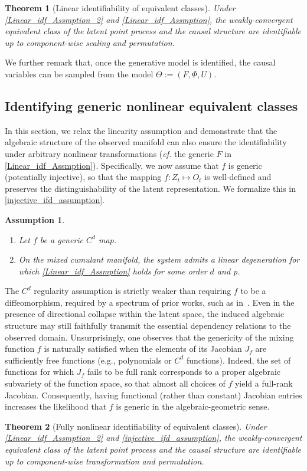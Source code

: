 \documentclass[10pt]{article}
\numberwithin{figure}{section}
\newtheorem{assumption}{Assumption}
\newtheorem{theorem}{Theorem}
\begin{document}
\begin{theorem}[Linear identifiability of equivalent classes]\label{linear_idf}
Under \autoref{Linear_idf_Assmption_2} and \ref{Linear_idf_Assmption},  the weakly-convergent equivalent class of the latent point process and the causal structure are identifiable up to component-wise scaling and permutation.
\end{theorem}

We further remark that,  once the generative model is identified, the causal variables can be sampled from the model $\Theta:=(F,\Phi, U)$.


\subsection{Identifying generic nonlinear equivalent classes }

In this section, we relax the linearity assumption and demonstrate that the algebraic structure of the observed manifold can also ensure the identifiability under arbitrary nonlinear transformations (\textit{cf.} the generic $F$ in \autoref{Linear_idf_Assmption}). Specifically, we now assume that $f$ is generic (potentially injective), so that the mapping $f: Z_t \mapsto O_t$ is well-defined and preserves the distinguishability of the latent representation. We formalize this in \autoref{injective_ifd_assumption}. 
\begin{assumption}\label{injective_ifd_assumption}
    \leavevmode
\begin{enumerate}
    \item Let $f$ be a generic $C^d$ map.
    \item On the mixed cumulant manifold, the system admits a linear degeneration for which \autoref{Linear_idf_Assmption} holds for some order $d$ and p.
\end{enumerate}
\end{assumption}
The $C^d$ regularity assumption is strictly weaker than requiring $f$ to be a diffeomorphism, required by a spectrum of prior works, such as in~\citep{song_temporally_2023}. Even in the presence of directional collapse within the latent space, the induced algebraic structure may still faithfully transmit the essential dependency relations to the observed domain. Unsurprisingly, one observes that the genericity of the mixing function $f$ is naturally satisfied when the elements of its Jacobian $J_f$ are sufficiently free functions (e.g., polynomials or $C^d$ functions). Indeed, the set of functions for which $J_f$ fails to be full rank corresponds to a proper algebraic subvariety of the function space, so that almost all choices of $f$ yield a full-rank Jacobian. Consequently, having functional (rather than constant) Jacobian entries increases the likelihood that $f$ is generic in the algebraic-geometric sense.
\begin{theorem}[Fully nonlinear identifiability of equivalent classes]\label{mainthm1}
    Under \autoref{Linear_idf_Assmption_2} and \autoref{injective_ifd_assumption}, the weakly-convergent equivalent class of the latent point process and the causal structure are identifiable up to component-wise transformation and permutation.
\end{theorem}
\end{document}
